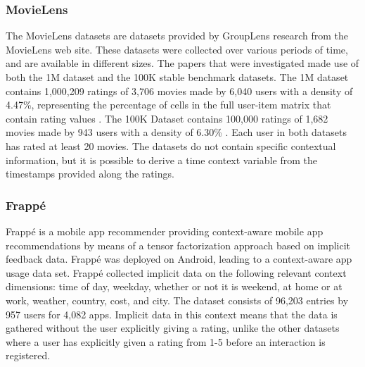 \subsubsection{MovieLens}
The MovieLens\cite{movielens} datasets are datasets provided by GroupLens research from the MovieLens web site.
These datasets were collected over various periods of time, and are available in different sizes.
The papers that were investigated made use of both the 1M dataset and the 100K stable benchmark datasets.
The 1M dataset contains 1,000,209 ratings of 3,706 movies made by 6,040 users with a density of 4.47\%, representing the percentage of cells in the full user-item matrix that contain rating values \cite{MovieLens2015}.
The 100K Dataset contains 100,000 ratings of 1,682 movies made by 943 users with a density of 6.30\% \cite{MovieLens2015}.
Each user in both datasets has rated at least 20 movies.
The datasets do not contain specific contextual information, but it is possible to derive a time context variable from the timestamps provided along the ratings.

\subsubsection{Frappé}
Frappé\cite{baltrunas2015frappe} is a mobile app recommender providing context-aware mobile app recommendations by means of a tensor factorization approach based on implicit feedback data.
Frappé was deployed on Android, leading to a context-aware app usage data set.
Frappé collected implicit data on the following relevant context dimensions: time of day, weekday, whether or not it is weekend, at home or at work, weather, country, cost, and city. 
The dataset consists of 96,203 entries by 957 users for 4,082 apps.
Implicit data in this context means that the data is gathered without the user explicitly giving a rating, unlike the other datasets where a user has explicitly given a rating from 1-5 before an interaction is registered.

